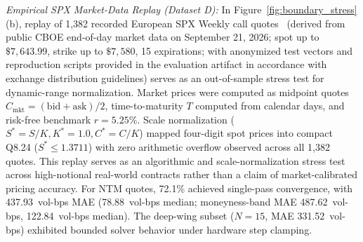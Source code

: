 \documentclass[sigconf,anonymous,review]{acmart}
\begin{document}
\textit{Empirical SPX Market-Data Replay (Dataset D):}\label{sec:spx_replay} In Figure~\ref{fig:boundary_stress}(b), replay of 1,382 recorded European SPX Weekly call quotes~\cite{cboe2026marketdata} (derived from public CBOE end-of-day market data on September 21, 2026; spot up to $\$7{,}643.99$, strike up to $\$7{,}580$, 15 expirations; with anonymized test vectors and reproduction scripts provided in the evaluation artifact in accordance with exchange distribution guidelines) serves as an out-of-sample stress test for dynamic-range normalization. Market prices were computed as midpoint quotes $C_{\text{mkt}} = (\text{bid} + \text{ask}) / 2$, time-to-maturity $T$ computed from calendar days, and risk-free benchmark $r = 5.25\%$. Scale normalization ($S^* = S/K, K^* = 1.0, C^* = C/K$) mapped four-digit spot prices into compact Q8.24 ($S^* \le 1.3711$) with zero arithmetic overflow observed across all 1,382 quotes. This replay serves as an algorithmic and scale-normalization stress test across high-notional real-world contracts rather than a claim of market-calibrated pricing accuracy. For NTM quotes, 72.1\% achieved single-pass convergence, with 437.93~vol-bps MAE (78.88~vol-bps median; moneyness-band MAE 487.62~vol-bps, 122.84~vol-bps median). The deep-wing subset ($N=15$, MAE 331.52~vol-bps) exhibited bounded solver behavior under hardware step clamping.
\end{document}
